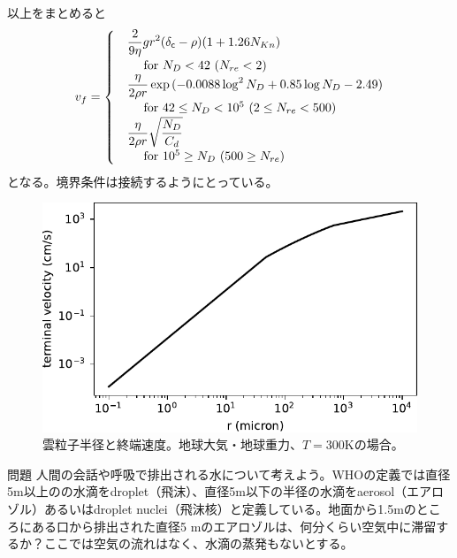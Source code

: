 以上をまとめると
\begin{align}
\label{eq:vterm}
v_f =
\begin{cases}
&\displaystyle{\frac{2}{9 \eta} g r^2 (\delta_{\mathsf{c}}- \rho) (1+1.26 N_{Kn}) } \nonumber \\
&\,\,\,\,\, \mbox{\, for $N_D < 42$ ($N_{re} < 2$)} \\
&\displaystyle{ \frac{\eta}{2 \rho r} \exp{(-0.0088 \log^2{N_D}+0.85 \log{N_D} -2.49)}} \nonumber \\
&\,\,\,\,\, \mbox{\, for $42 \le N_D < 10^5$ ($2 \le N_{re} < 500$)} \\
&\displaystyle{\frac{\eta}{2 \rho r} \sqrt{\frac{N_D}{C_d}}} \nonumber \\
&\,\,\,\,\, \mbox{\, for $10^5 \ge N_D$ ($500 \ge N_{re}$)} 
\end{cases}
\end{align}
となる。境界条件は接続するようにとっている。

\begin{figure}[htb]
\begin{center}
\includegraphics[width=\linewidth]{fig/clouds/vterm.pdf}
\caption{雲粒子半径と終端速度。地球大気・地球重力、$T=300$Kの場合。\label{fig:vterm}}
\end{center}
\end{figure}


\begin{itembox}{問題}
人間の会話や呼吸で排出される水について考えよう。WHOの定義では直径5\textmu m以上のの水滴をdroplet（飛沫）、直径5\textmu m以下の半径の水滴をaerosol（エアロゾル）あるいはdroplet nuclei（飛沫核）と定義している。地面から1.5mのところにある口から排出された直径5 \textmu mのエアロゾルは、何分くらい空気中に滞留するか？ここでは空気の流れはなく、水滴の蒸発もないとする。
\end{itembox}







